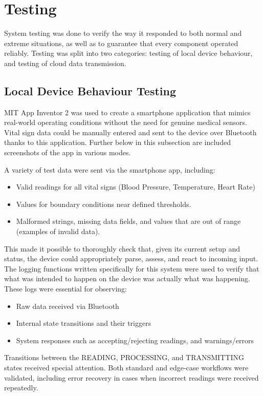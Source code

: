 \section{Testing}
System testing was done to verify the way it responded to both normal and extreme situations, as well as to guarantee that every component operated reliably. Testing was split into two categories: testing of local device behaviour, and testing of cloud data transmission.

\subsection{Local Device Behaviour Testing}
MIT App Inventor 2 was used to create a smartphone application that mimics real-world operating conditions without the need for genuine medical sensors. Vital sign data could be manually entered and sent to the device over Bluetooth thanks to this application. Further below in this subsection are included screenshots of the app in various modes.

A variety of test data were sent via the smartphone app, including:

\begin{itemize}
	\item Valid readings for all vital signs (Blood Pressure, Temperature, Heart Rate)
	\item Values for boundary conditions near defined thresholds.
	\item Malformed strings, missing data fields, and values that are out of range (examples of invalid data).
\end{itemize}

This made it possible to thoroughly check that, given its current setup and status, the device could appropriately parse, assess, and react to incoming input. The logging functions written specifically for this system were used to verify that what was intended to happen on the device was actually what was happening. These logs were essential for observing:

\begin{itemize}
	\item Raw data received via Bluetooth
	\item Internal state transitions and their triggers
	\item System responses such as accepting/rejecting readings, and warnings/errors
\end{itemize}

Transitions between the READING, PROCESSING, and TRANSMITTING states received special attention. Both standard and edge-case workflows were validated, including error recovery in cases when incorrect readings were received repeatedly.

